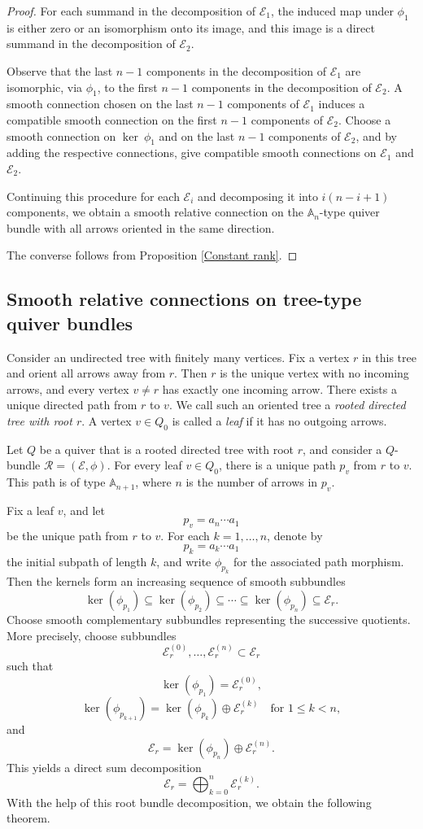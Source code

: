 \documentclass[12pt, reqno]{amsart}
\theoremstyle{plain}
\numberwithin{equation}{section}
\newcommand{\E}{\mathcal{E}}
\begin{document}
\begin{proof}
For each summand in the decomposition of $\E_1$, the induced map under $\phi_1$ is either zero or an isomorphism onto its image, and this image is a direct summand in the decomposition of $\E_2$.

Observe that the last $n-1$ components in the decomposition of $\E_1$ are isomorphic, via $\phi_1$, to the first $n-1$ components in the decomposition of $\E_2$.
 A smooth connection chosen on the last $n-1$ components of $\E_1$ induces a compatible smooth connection on the first $n-1$ components of $\E_2$.
 Choose a smooth connection on $\ker~\phi_1$ and on the last $n-1$ components of $\E_2$, and by adding the respective connections, give compatible smooth connections on $\E_1$ and $\E_2$.

Continuing this procedure for each $\E_i$ and decomposing it into $i(n-i+1)$ components, we obtain a smooth relative connection on the $\mathbb{A}_n$-type quiver bundle with all arrows oriented in the same direction.

The converse follows from Proposition \ref{Constant rank}.
\end{proof}

\subsection{Smooth relative connections on tree-type quiver bundles}\label{tree conn}

Consider an undirected tree with finitely many vertices. Fix a vertex $r$ in this tree and orient all arrows away from $r$. Then $r$ is the unique vertex with no incoming arrows, and every vertex $v \neq r$ has exactly one incoming arrow. There exists a unique directed path from $r$ to $v$. We call such an oriented tree a \emph{rooted directed tree with root $r$}.
A vertex $v \in Q_0$ is called a \emph{leaf} if it has no outgoing arrows.

Let $Q$ be a quiver that is a rooted directed tree with root $r$, and consider a $Q$-bundle $\mathcal{R}=(\mathcal{E},\phi)$. For every leaf $v \in Q_0$, there is a unique path $p_v$ from $r$ to $v$. This path is of type $\mathbb{A}_{n+1}$, where $n$ is the number of arrows in $p_v$.


Fix a leaf $v$, and let
\[
p_v = a_n \cdots a_1
\]
be the unique path from $r$ to $v$. For each $k = 1, \dots, n$, denote by
\[
p_k = a_k \cdots a_1
\]
the initial subpath of length $k$, and write $\phi_{p_k}$ for the associated path morphism. Then the kernels form an increasing sequence of smooth subbundles
\[
\ker(\phi_{p_1}) \subseteq \ker(\phi_{p_2}) \subseteq \cdots \subseteq \ker(\phi_{p_n}) \subseteq \mathcal{E}_r.
\]
Choose smooth complementary subbundles representing the successive quotients. More precisely, choose subbundles
\[
\mathcal{E}_r^{(0)}, \dots, \mathcal{E}_r^{(n)} \subset \mathcal{E}_r
\]
such that
\[
\ker(\phi_{p_1}) = \mathcal{E}_r^{(0)},
\]
\[
\ker(\phi_{p_{k+1}})
=
\ker(\phi_{p_k})
\oplus
\mathcal{E}_r^{(k)}
\quad \text{for } 1 \le k < n,
\]
and
\[
\mathcal{E}_r
=
\ker(\phi_{p_n})
\oplus
\mathcal{E}_r^{(n)}.
\]
This yields a direct sum decomposition
\[
\mathcal{E}_r
=
\bigoplus_{k=0}^{n}
\mathcal{E}_r^{(k)}.
\]
With the help of this root bundle decomposition, we obtain the following theorem.
\end{document}

